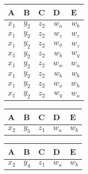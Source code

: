 \documentclass{article}
\begin{document}
\parbox{.45\linewidth}{
\begin{center}
  \begin{tabular}{lllll}
  	\hline
    A & B & C & D & E\\
    \hline
    \multicolumn{1}{|c|}{$x_1$} & \multicolumn{1}{c|}{$y_2$} & \multicolumn{1}{c|}{$z_2$} & \multicolumn{1}{c|}{$w_a$} & \multicolumn{1}{c|}{$w_b$}\\ \hline
    \multicolumn{1}{|c|}{$x_1$} & \multicolumn{1}{c|}{$y_2$} & \multicolumn{1}{c|}{$z_2$} & \multicolumn{1}{c|}{$w_z$} & \multicolumn{1}{c|}{$w_z$}\\ \hline
    \multicolumn{1}{|c|}{$x_1$} & \multicolumn{1}{c|}{$y_2$} & \multicolumn{1}{c|}{$z_2$} & \multicolumn{1}{c|}{$w_\phi$} & \multicolumn{1}{c|}{$w_z$}\\ \hline
    \multicolumn{1}{|c|}{$x_1$} & \multicolumn{1}{c|}{$y_2$} & \multicolumn{1}{c|}{$z_2$} & \multicolumn{1}{c|}{$w_b$} & \multicolumn{1}{c|}{$w_q$}\\ \hline
    \multicolumn{1}{|c|}{$x_1$} & \multicolumn{1}{c|}{$y_2$} & \multicolumn{1}{c|}{$z_2$} & \multicolumn{1}{c|}{$w_w$} & \multicolumn{1}{c|}{$w_u$}\\ \hline
    \multicolumn{1}{|c|}{$x_1$} & \multicolumn{1}{c|}{$y_2$} & \multicolumn{1}{c|}{$z_2$} & \multicolumn{1}{c|}{$w_b$} & \multicolumn{1}{c|}{$w_b$}\\ \hline
    \multicolumn{1}{|c|}{$x_1$} & \multicolumn{1}{c|}{$y_2$} & \multicolumn{1}{c|}{$z_2$} & \multicolumn{1}{c|}{$w_x$} & \multicolumn{1}{c|}{$w_h$}\\ \hline
    \multicolumn{1}{|c|}{$x_1$} & \multicolumn{1}{c|}{$y_2$} & \multicolumn{1}{c|}{$z_2$} & \multicolumn{1}{c|}{$w_q$} & \multicolumn{1}{c|}{$w_a$}\\ \hline
  \end{tabular}

\vskip 0.2in

  \begin{tabular}{lllll}
  	\hline
    A & B & C & D & E\\
    \hline
    \multicolumn{1}{|c|}{$x_2$} & \multicolumn{1}{c|}{$y_5$} & \multicolumn{1}{c|}{$z_1$} & \multicolumn{1}{c|}{$w_a$} & \multicolumn{1}{c|}{$w_b$}\\ \hline
  \end{tabular}
  
\vskip 0.2in
  
  \begin{tabular}{lllll}
  	\hline
    A & B & C & D & E\\
    \hline
    \multicolumn{1}{|c|}{$x_2$} & \multicolumn{1}{c|}{$y_4$} & \multicolumn{1}{c|}{$z_1$} & \multicolumn{1}{c|}{$w_a$} & \multicolumn{1}{c|}{$w_b$}\\ \hline
  \end{tabular}
\end{center}
}
\end{document}

